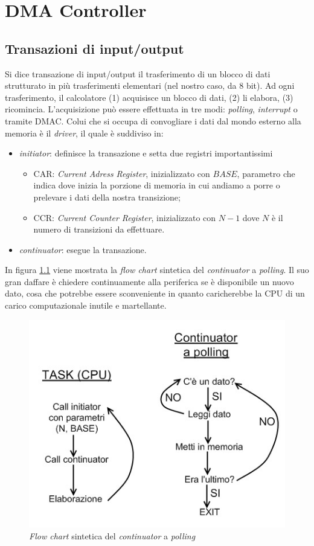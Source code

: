 \chapter{DMA Controller}
\label{cha:DMA}

\section{Transazioni di input/output}
\label{sec:transazioniIO}

Si dice transazione di input/output il trasferimento di un blocco di dati strutturato in più trasferimenti elementari (nel nostro caso, da 8 bit). Ad ogni trasferimento, il calcolatore (1) acquisisce un blocco di dati, (2) li elabora, (3) ricomincia.
L'acquisizione può essere effettuata in tre modi: \textit{polling}, \textit{interrupt} o tramite DMAC.
Colui che si occupa di convogliare i dati dal mondo esterno alla memoria è il \textit{driver}, il quale è suddiviso in:
\begin{itemize}
\item \textit{initiator}: definisce la transazione e setta due registri importantissimi
\begin{itemize}
\item CAR: \textit{Current Adress Register}, inizializzato con $BASE$, parametro che indica dove inizia la porzione di memoria in cui andiamo a porre o prelevare i dati della nostra transizione;
\item CCR: \textit{Current Counter Register}, inizializzato con $N-1$ dove $N$ è il numero di transizioni da effettuare.
\end{itemize}
\item \textit{continuator}: esegue la transazione.
\end{itemize}

In figura \ref{fig:taskContinuator} viene mostrata la \textit{flow chart} sintetica del \textit{continuator} a \textit{polling}. Il suo gran daffare è chiedere continuamente alla periferica se è disponibile un nuovo dato, cosa che potrebbe essere sconveniente in quanto caricherebbe la CPU di un carico computazionale inutile e martellante.

\begin{figure}[!h]
\centering
\includegraphics[width=0.6\columnwidth]{img/taskContinuator}
\caption{\textit{Flow chart} sintetica del \textit{continuator} a \textit{polling}}
\label{fig:taskContinuator}
\end{figure}

